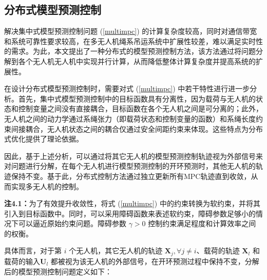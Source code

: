 \documentclass[lang=chs, degree=master, blindreview=true, winfonts=true]{yanputhesis}
\begin{document}
\subsection{分布式模型预测控制}
解决集中式模型预测控制问题 (\ref{multimpc}) 的计算复杂度较高，同时对通信带宽和系统可靠性要求较高，在多无人机绳系吊运系统中扩展性较差，难以满足实时性的需求。为此，本文提出了一种分布式的模型预测控制方法，该方法通过将问题分解到各个无人机无人机中实现并行计算，从而降低整体计算复杂度并提高系统的扩展性。

在设计分布式模型预测控制时，需要对式 (\ref{multimpc}) 中若干特性进行进一步分析。首先，集中式模型预测控制中的目标函数具有分离性，因为载荷与无人机的状态和控制变量之间没有直接耦合，目标函数在各个无人机之间是可分离的；此外，无人机之间的动力学通过系绳张力（即载荷状态和控制变量的函数）和系绳长度约束间接耦合，无人机状态之间的耦合仅通过安全间距约束来体现。这些特点为分布式优化提供了理论依据。

因此，基于上述分析，可以通过将其它无人机的模型预测控制轨迹视为外部信号来对问题进行分解，在每个无人机进行模型预测控制的开环预测时，其他无人机的轨迹保持不变。基于此，分布式控制方法通过独立更新所有MPC轨迹直到收敛，从而实现多无人机的控制。

\textbf{注4.1：}为了有效提升收敛性，将式 (\ref{multimpc}) 中的约束转换为软约束，并将其引入到目标函数中。同时，可以采用障碍函数来表述软约束，障碍参数足够小的情况下可以逼近原始约束问题。障碍参数 $\gamma > 0$ 控制约束满足程度和计算效率之间的权衡。





具体而言，对于第 $i$ 个无人机，其它无人机的轨迹 $ \bm X_j, \forall j \neq i$、载荷的轨迹 $\bm X_l$ 和 载荷的输入$\bm U_l$ 都被视为该无人机的外部信号，在开环预测过程中保持不变，分解后的模型预测控制问题定义如下：
\end{document}
